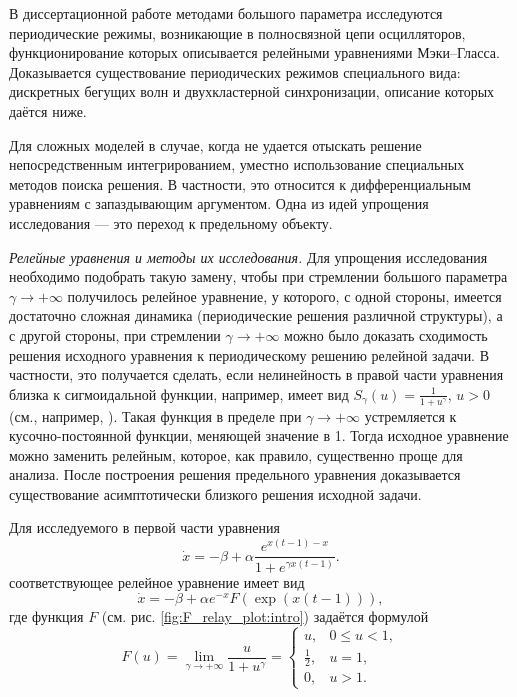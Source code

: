 В диссертационной работе методами большого параметра исследуются периодические режимы, возникающие в полносвязной цепи осцилляторов, функционирование которых описывается релейными уравнениями Мэки--Гласса. Доказывается существование периодических режимов специального вида: дискретных бегущих волн и двухкластерной синхронизации, описание которых даётся ниже.

{\methods} Для сложных моделей в случае, когда не удается отыскать решение непосредственным интегрированием, уместно использование специальных методов поиска решения. В частности, это относится к дифференциальным уравнениям с запаздывающим аргументом. Одна из идей упрощения исследования --- это переход к предельному объекту.

\textit{Релейные уравнения и методы их исследования.} Для упрощения исследования необходимо подобрать такую замену, чтобы при стремлении большого параметра $\gamma \to +\infty$ получилось релейное уравнение, у которого, с одной стороны, имеется достаточно сложная динамика (периодические решения различной структуры), а с другой стороны, при стремлении $\gamma \to +\infty$ можно было доказать сходимость решения исходного уравнения к периодическому решению релейной задачи. В частности, это получается сделать, если нелинейность в правой части уравнения близка к сигмоидальной функции, например, имеет вид $S_\gamma(u)=\frac{1}{1 + u^\gamma}$, $u > 0$ (см., например, \cite{Preobrazhenskaya2020, Glyzin2017, Krisztin2020, Bartha2021}). Такая функция в пределе при $\gamma\to+\infty$ устремляется к кусочно-постоянной функции, меняющей значение в 1. Тогда исходное уравнение можно заменить релейным, которое, как правило, существенно проще для анализа. После построения решения предельного уравнения доказывается существование асимптотически близкого решения исходной задачи.

Для исследуемого в первой части уравнения
\begin{equation}
\label{eq:intro:MG_norm1}
	\dot{x}=-\beta+\alpha\frac{e^{x(t-1)-x}}{1+e^{\gamma x(t-1)}}.
\end{equation}
соответствующее релейное уравнение имеет вид
\[
\dot{x}=-\beta + \alpha e^{-x} F(\exp({x(t-1)})),
\]
где функция $F$ (см. рис. \ref{fig:F_relay_plot:intro}) задаётся формулой
\begin{equation}
	\label{eq:intro:F_relay}
	F(u)=\lim\limits_{\gamma\to +\infty}\frac{u}{1+u^{\gamma}} = 
	\begin{cases}
		u, & 0 \leq u < 1,\\
		\frac{1}{2}, & u = 1,\\
		0, & u > 1.
	\end{cases}
\end{equation}

